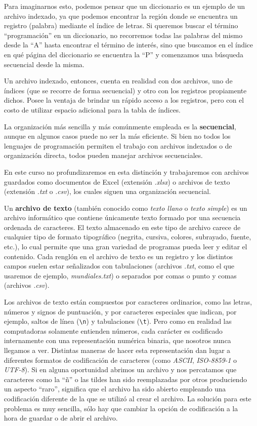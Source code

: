 \documentclass[
]{book}
\begin{document}
\begin{itemize}
  Para imaginarnos esto, podemos pensar que un diccionario es un ejemplo de un archivo indexado, ya que podemos encontrar la región donde se encuentra un registro (palabra) mediante el índice de letras. Si queremos buscar el término ``programación'' en un diccionario, no recorremos todas las palabras del mismo desde la ``A'' hasta encontrar el término de interés, sino que buscamos en el índice en qué página del diccionario se encuentra la ``P'' y comenzamos una búsqueda secuencial desde la misma.

  Un archivo indexado, entonces, cuenta en realidad con dos archivos, uno de índices (que se recorre de forma secuencial) y otro con los registros propiamente dichos. Posee la ventaja de brindar un rápido acceso a los registros, pero con el costo de utilizar espacio adicional para la tabla de índices.
\end{itemize}

La organización más sencilla y más comúnmente empleada es la \textbf{secuencial}, aunque en algunos casos puede no ser la más eficiente. Si bien no todos los lenguajes de programación permiten el trabajo con archivos indexados o de organización directa, todos pueden manejar archivos secuenciales.

En este curso no profundizaremos en esta distinción y trabajaremos con archivos guardados como documentos de Excel (extensión \emph{.xlsx}) o archivos de texto (extensión \emph{.txt} o \emph{.csv}), los cuales siguen una organización secuencial.

Un \textbf{archivo de texto} (también conocido como \emph{texto llano} o \emph{texto simple}) es un archivo informático que contiene únicamente texto formado por una secuencia ordenada de caracteres. El texto almacenado en este tipo de archivo carece de cualquier tipo de formato tipográfico (negrita, cursiva, colores, subrayado, fuente, etc.), lo cual permite que una gran variedad de programas pueda leer y editar el contenido. Cada renglón en el archivo de texto es un registro y los distintos campos suelen estar señalizados con tabulaciones (archivos \emph{.txt}, como el que usaremos de ejemplo, \emph{mundiales.txt}) o separados por comas o punto y comas (archivos \emph{.csv}).

Los archivos de texto están compuestos por caracteres ordinarios, como las letras, números y signos de puntuación, y por caracteres especiales que indican, por ejemplo, saltos de línea (\texttt{\textbackslash{}n}) y tabulaciones (\texttt{\textbackslash{}t}). Pero como en realidad las computadoras solamente entienden números, cada carácter es codificado internamente con una representación numérica binaria, que nosotros nunca llegamos a ver. Distintas maneras de hacer esta representación dan lugar a diferentes formatos de codificación de caracteres (como \emph{ASCII}, \emph{ISO-8859-1} o \emph{UTF-8}). Si en alguna oportunidad abrimos un archivo y nos percatamos que caracteres como la ``ñ'' o las tildes han sido reemplazadas por otros produciendo un aspecto ``raro'', significa que el archivo ha sido abierto empleando una codificación diferente de la que se utilizó al crear el archivo. La solución para este problema es muy sencilla, sólo hay que cambiar la opción de codificación a la hora de guardar o de abrir el archivo.
\end{document}
